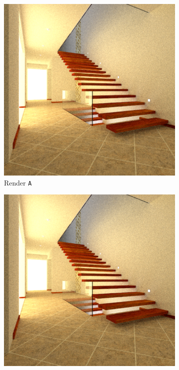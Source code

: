 \begin{figure}
	\centering
	\begin{subfigure}[t]{0.32\linewidth}
		\includegraphics[width=\textwidth]{chapters/chapter_results/correctrender2}
		\caption{Render \texttt{A}}
	\end{subfigure}
	\begin{subfigure}[t]{0.32\linewidth}
		\includegraphics[width=\textwidth]{chapters/chapter_results/wrongrender2}

\end{subfigure}
\end{figure}
